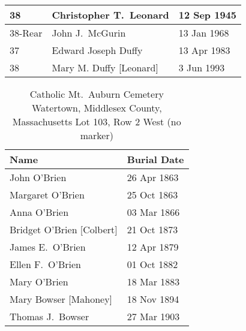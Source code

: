 \begin{table}[ht]
\begin{tabular}{|l|l|l|}
		38 & Christopher T.\ Leonard\index{Leonard!Christopher T.} & 12 Sep 1945 \\ \hline
		38-Rear & John J.\ McGurin\index{McGurin!John Joseph} & 13 Jan 1968 \\ \hline
		37 & Edward Joseph Duffy\index{Duffy!Edward J.} & 13 Apr 1983 \\ \hline
		38 & Mary M. Duffy [Leonard]\index{Leonard!Mary Margaret\textsuperscript{5}}\index{Duffy!Mary Margaret\textsuperscript{5} (Leonard)} & 3 Jun 1993 \\ \hline
	\end{tabular}
\end{table}

\begin{table}[ht]
	\centering
	\caption{Catholic Mt.\ Auburn Cemetery\cite{BillMcEvoy} \\
		Watertown, Middlesex County, Massachusetts
		Lot 103, Row 2 West (no marker)}
	\begin{tabular}{|l|l|}
		\hline
		\textbf{Name} & \textbf{Burial Date} \\
		\hline
		John O'Brien\index{O'Brien!John\textsuperscript{2}} & 26 Apr 1863 \\
		\hline
		Margaret O'Brien\index{O'Brien!Margaret\textsuperscript{3} (1862--1863)} & 25 Oct 1863 \\
		\hline
		Anna O'Brien\index{O'Brien!Anna\textsuperscript{3}} & 03 Mar 1866 \\
		\hline
		Bridget O'Brien [Colbert]\index{Colbert!Bridget}\index{O'Brien!Bridget (Colbert)} & 21 Oct 1873 \\
		\hline
		James E.\ O'Brien\index{O'Brien!James Edward\textsuperscript{3}} & 12 Apr 1879 \\
		\hline
		Ellen F.\ O'Brien\index{O'Brien!Ellen/Nellie\textsuperscript{3} (1859--1882)} & 01 Oct 1882 \\
		\hline
		Mary O'Brien\index{O'Brien!Mary\textsuperscript{3} (1856--1883)} & 18 Mar 1883 \\
		\hline
		Mary Bowser [Mahoney]\index{Mahoney/Mahony!Mary}\index{O'Brien!Mary (Mahoney)}\index{Bowser!Mary (Mahoney) (O'Brien)} & 18 Nov 1894 \\
		\hline
		Thomas J.\ Bowser\index{Bowser!Thomas} & 27 Mar 1903 \\
		\hline
	\end{tabular}
\end{table}

